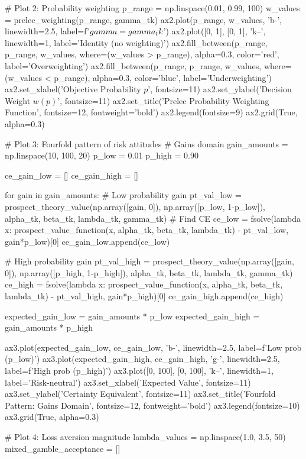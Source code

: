 \documentclass[a4paper, 11pt]{article}
\begin{document}
\begin{pycode}
# Plot 2: Probability weighting
p_range = np.linspace(0.01, 0.99, 100)
w_values = prelec_weighting(p_range, gamma_tk)
ax2.plot(p_range, w_values, 'b-', linewidth=2.5, label=f'$\\gamma={gamma_tk}$')
ax2.plot([0, 1], [0, 1], 'k--', linewidth=1, label='Identity (no weighting)')
ax2.fill_between(p_range, p_range, w_values, where=(w_values > p_range),
                  alpha=0.3, color='red', label='Overweighting')
ax2.fill_between(p_range, p_range, w_values, where=(w_values < p_range),
                  alpha=0.3, color='blue', label='Underweighting')
ax2.set_xlabel('Objective Probability $p$', fontsize=11)
ax2.set_ylabel('Decision Weight $w(p)$', fontsize=11)
ax2.set_title('Prelec Probability Weighting Function', fontsize=12, fontweight='bold')
ax2.legend(fontsize=9)
ax2.grid(True, alpha=0.3)

# Plot 3: Fourfold pattern of risk attitudes
# Gains domain
gain_amounts = np.linspace(10, 100, 20)
p_low = 0.01
p_high = 0.90

ce_gain_low = []
ce_gain_high = []

for gain in gain_amounts:
    # Low probability gain
    pt_val_low = prospect_theory_value(np.array([gain, 0]), np.array([p_low, 1-p_low]),
                                        alpha_tk, beta_tk, lambda_tk, gamma_tk)
    # Find CE
    ce_low = fsolve(lambda x: prospect_value_function(x, alpha_tk, beta_tk, lambda_tk) - pt_val_low, gain*p_low)[0]
    ce_gain_low.append(ce_low)

    # High probability gain
    pt_val_high = prospect_theory_value(np.array([gain, 0]), np.array([p_high, 1-p_high]),
                                         alpha_tk, beta_tk, lambda_tk, gamma_tk)
    ce_high = fsolve(lambda x: prospect_value_function(x, alpha_tk, beta_tk, lambda_tk) - pt_val_high, gain*p_high)[0]
    ce_gain_high.append(ce_high)

expected_gain_low = gain_amounts * p_low
expected_gain_high = gain_amounts * p_high

ax3.plot(expected_gain_low, ce_gain_low, 'b-', linewidth=2.5, label=f'Low prob ({p_low})')
ax3.plot(expected_gain_high, ce_gain_high, 'g-', linewidth=2.5, label=f'High prob ({p_high})')
ax3.plot([0, 100], [0, 100], 'k--', linewidth=1, label='Risk-neutral')
ax3.set_xlabel('Expected Value', fontsize=11)
ax3.set_ylabel('Certainty Equivalent', fontsize=11)
ax3.set_title('Fourfold Pattern: Gains Domain', fontsize=12, fontweight='bold')
ax3.legend(fontsize=10)
ax3.grid(True, alpha=0.3)

# Plot 4: Loss aversion magnitude
lambda_values = np.linspace(1.0, 3.5, 50)
mixed_gamble_acceptance = []


\end{pycode}
\end{document}
